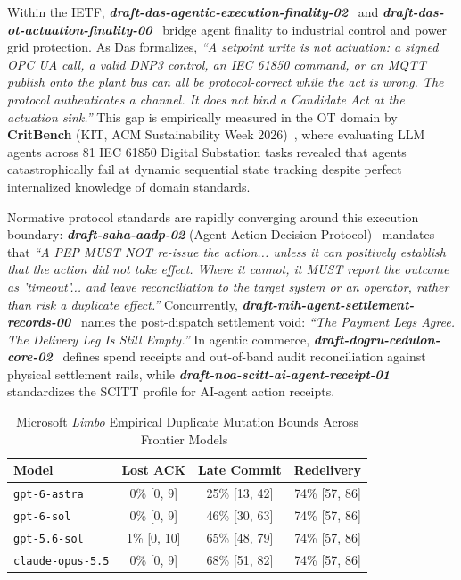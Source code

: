 \documentclass[10pt,journal,compsoc]{IEEEtran}
\begin{document}
Within the IETF, \textbf{\emph{draft-das-agentic-execution-finality-02}}~\cite{das2026finality} and \textbf{\emph{draft-das-ot-actuation-finality-00}}~\cite{das2026ot} bridge agent finality to industrial control and power grid protection. As Das formalizes, \emph{``A setpoint write is not actuation: a signed OPC UA call, a valid DNP3 control, an IEC 61850 command, or an MQTT publish onto the plant bus can all be protocol-correct while the act is wrong. The protocol authenticates a channel. It does not bind a Candidate Act at the actuation sink.''} This gap is empirically measured in the OT domain by \textbf{CritBench} (KIT, ACM Sustainability Week 2026)~\cite{critbench2026}, where evaluating LLM agents across 81 IEC 61850 Digital Substation tasks revealed that agents catastrophically fail at dynamic sequential state tracking despite perfect internalized knowledge of domain standards.

Normative protocol standards are rapidly converging around this execution boundary: \textbf{\emph{draft-saha-aadp-02}} (Agent Action Decision Protocol)~\cite{saha2026aadp} mandates that \emph{``A PEP MUST NOT re-issue the action... unless it can positively establish that the action did not take effect. Where it cannot, it MUST report the outcome as 'timeout'... and leave reconciliation to the target system or an operator, rather than risk a duplicate effect.''} Concurrently, \textbf{\emph{draft-mih-agent-settlement-records-00}}~\cite{mih2026settlement} names the post-dispatch settlement void: \emph{``The Payment Legs Agree. The Delivery Leg Is Still Empty.''} In agentic commerce, \textbf{\emph{draft-dogru-cedulon-core-02}}~\cite{dogru2026cedulon} defines spend receipts and out-of-band audit reconciliation against physical settlement rails, while \textbf{\emph{draft-noa-scitt-ai-agent-receipt-01}}~\cite{noa2026scitt} standardizes the SCITT profile for AI-agent action receipts.

\begin{table}[h]
\centering
\caption{Microsoft \emph{Limbo} Empirical Duplicate Mutation Bounds Across Frontier Models~\cite{limbo2026}}
\label{tab:limbo_models}
\begin{tabular}{lccc}
\toprule
\textbf{Model} & \textbf{Lost ACK} & \textbf{Late Commit} & \textbf{Redelivery} \\
\midrule
\texttt{gpt-6-astra} & 0\% [0, 9] & 25\% [13, 42] & 74\% [57, 86] \\
\texttt{gpt-6-sol} & 0\% [0, 9] & 46\% [30, 63] & 74\% [57, 86] \\
\texttt{gpt-5.6-sol} & 1\% [0, 10] & 65\% [48, 79] & 74\% [57, 86] \\
\texttt{claude-opus-5.5} & 0\% [0, 9] & 68\% [51, 82] & 74\% [57, 86] \\
\bottomrule
\end{tabular}
\end{table}
\end{document}
